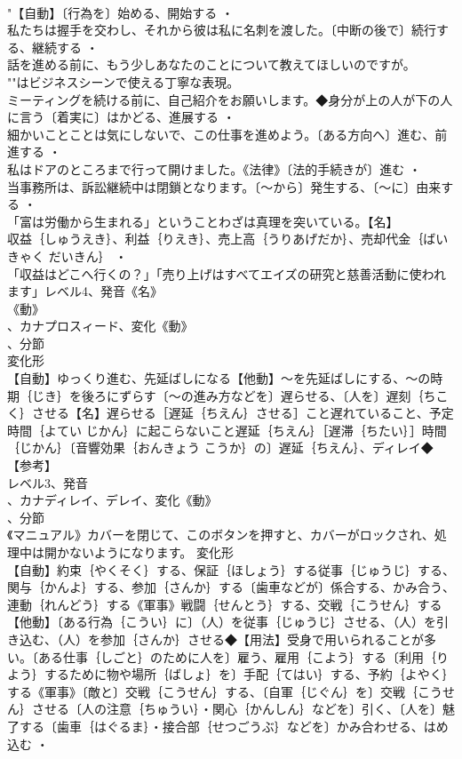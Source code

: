\documentclass[8pt]{extreport}
\begin{document}
\begin{CJK}{UTF8}{min}
\\	"【自動】〔行為を〕始める、開始する ・
\\	私たちは握手を交わし、それから彼は私に名刺を渡した。〔中断の後で〕続行する、継続する ・
\\	話を進める前に、もう少しあなたのことについて教えてほしいのですが。
\\	""はビジネスシーンで使える丁寧な表現。
\\	ミーティングを続ける前に、自己紹介をお願いします。◆身分が上の人が下の人に言う〔着実に〕はかどる、進展する ・
\\	細かいことことは気にしないで、この仕事を進めよう。〔ある方向へ〕進む、前進する ・
\\	私はドアのところまで行って開けました。《法律》〔法的手続きが〕進む ・
\\	当事務所は、訴訟継続中は閉鎖となります。〔～から〕発生する、〔～に〕由来する ・
\\	「富は労働から生まれる」ということわざは真理を突いている。【名】
\\	収益｛しゅうえき｝、利益｛りえき｝、売上高｛うりあげだか｝、売却代金｛ばいきゃく だいきん｝ ・
\\	「収益はどこへ行くの？」「売り上げはすべてエイズの研究と慈善活動に使われます」レベル4、発音《名》
\\	《動》
\\	、カナプロスィード、変化《動》
\\	、分節
\\	変化形 
\\	【自動】ゆっくり進む、先延ばしになる【他動】～を先延ばしにする、～の時期｛じき｝を後ろにずらす〔～の進み方などを〕遅らせる、〔人を〕遅刻｛ちこく｝させる【名】遅らせる［遅延｛ちえん｝させる］こと遅れていること、予定時間｛よてい じかん｝に起こらないこと遅延｛ちえん｝［遅滞｛ちたい｝］時間｛じかん｝〔音響効果｛おんきょう こうか｝の〕遅延｛ちえん｝、ディレイ◆【参考】
\\	レベル3、発音
\\	、カナディレイ、デレイ、変化《動》
\\	、分節
\\	《マニュアル》カバーを閉じて、このボタンを押すと、カバーがロックされ、処理中は開かないようになります。	変化形 
\\	【自動】約束｛やくそく｝する、保証｛ほしょう｝する従事｛じゅうじ｝する、関与｛かんよ｝する、参加｛さんか｝する〔歯車などが〕係合する、かみ合う、連動｛れんどう｝する《軍事》戦闘｛せんとう｝する、交戦｛こうせん｝する【他動】〔ある行為｛こうい｝に〕（人）を従事｛じゅうじ｝させる、（人）を引き込む、（人）を参加｛さんか｝させる◆【用法】受身で用いられることが多い。〔ある仕事｛しごと｝のために人を〕雇う、雇用｛こよう｝する〔利用｛りよう｝するために物や場所｛ばしょ｝を〕手配｛てはい｝する、予約｛よやく｝する《軍事》〔敵と〕交戦｛こうせん｝する、〔自軍｛じぐん｝を〕交戦｛こうせん｝させる〔人の注意｛ちゅうい｝・関心｛かんしん｝などを〕引く、〔人を〕魅了する〔歯車｛はぐるま｝・接合部｛せつごうぶ｝などを〕かみ合わせる、はめ込む ・

\end{CJK}
\end{document}
